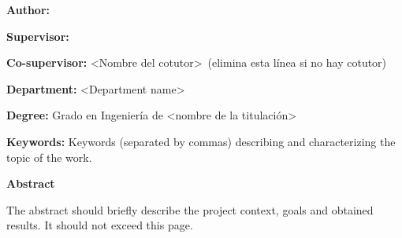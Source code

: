
\pagestyle{fancy}


\bigskip

\begin{center}
	\Large \scshape
	\textbf{\tfgtitlenameENG}
\end{center}

\bigskip \bigskip \bigskip

\begin{minipage}{\textwidth}

\textbf{Author:} \tfgauthorname

\medskip

\textbf{Supervisor:} \tfgtutorname

\medskip

\textbf{Co-supervisor:} <Nombre del cotutor>\ (elimina esta línea si no hay cotutor)

\medskip

\textbf{Department:} <Department name>

\medskip

\textbf{Degree:} Grado en Ingeniería de <nombre de la titulación>

\medskip

\textbf{Keywords:} Keywords (separated by commas) describing and characterizing the topic of the work.

\bigskip \bigskip


\end{minipage}

\begin{center}
	\textbf{Abstract}
\end{center}

The abstract should briefly describe the project context, goals and
obtained results. It should not exceed this page.

\blankpage